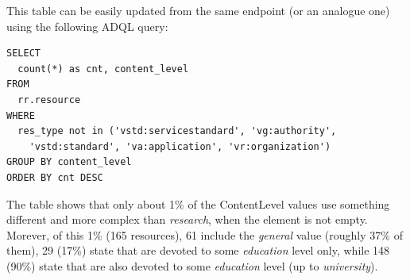 \documentclass{ivoa}
\begin{document}
This table can be easily updated from the same endpoint (or an analogue 
one) using the following ADQL query:

\begin{verbatim}
SELECT 
  count(*) as cnt, content_level
FROM 
  rr.resource
WHERE
  res_type not in ('vstd:servicestandard', 'vg:authority', 
    'vstd:standard', 'va:application', 'vr:organization')
GROUP BY content_level
ORDER BY cnt DESC
\end{verbatim}

The table shows that only about 1\% of the ContentLevel values use 
something different and more complex than 
\emph{research}, when 
the element is not empty. Morever, of this 1\% (165 resources), 
61 include the \emph{general} value (roughly 37\% of them), 
29 (17\%) state that are devoted to some 
\emph{education} level only,
while 148 (90\%) state that are also devoted to some 
\emph{education} level (up to 
\emph{university}).


\end{document}
